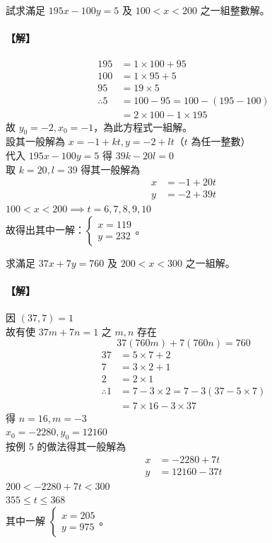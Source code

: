 \begin{example}\label{ex:6-2-10}
試求滿足 $195x - 100y = 5$ 及 $100 < x < 200$ 之一組整數解。

\paragraph{【解】}
\begin{align*}
  195 &= 1 \times 100 + 95 \\
  100 &= 1 \times 95 + 5 \\
  95 &= 19 \times 5 \\
  \therefore 5 &= 100 - 95 = 100 - (195 - 100) \\
  &= 2 \times 100 - 1 \times 195
\end{align*}
故 $y_0 = -2, x_0 = -1$，為此方程式一組解。\\
設其一般解為 $x = -1 + kt, y = -2 + lt$（$t$ 為任一整數）\\
代入 $195x - 100y = 5$ 得 $39k - 20l = 0$\\
取 $k=20, l=39$ 得其一般解為
\begin{align*}
  x &= -1 + 20t \\
  y &= -2 + 39t
\end{align*}
$100 < x < 200 \implies t = 6, 7, 8, 9, 10$\\
故得出其中一解：$\begin{cases} x = 119 \\ y = 232 \end{cases}$。
\end{example}

\begin{example}\label{ex:6-2-11}
求滿足 $37x + 7y = 760$ 及 $200 < x < 300$ 之一組解。

\paragraph{【解】}
因 $(37, 7) = 1$\\
故有使 $37m + 7n = 1$ 之 $m, n$ 存在
\begin{equation*}
  37(760m) + 7(760n) = 760
\end{equation*}
\begin{align*}
  37 &= 5 \times 7 + 2 \\
  7 &= 3 \times 2 + 1 \\
  2 &= 2 \times 1 \\
  \therefore 1 &= 7 - 3 \times 2 = 7 - 3(37 - 5 \times 7) \\
  &= 7 \times 16 - 3 \times 37
\end{align*}
得 $n=16, m=-3$\\
$x_0 = -2280, y_0 = 12160$\\
按例 5 的做法得其一般解為
\begin{align*}
  x &= -2280 + 7t \\
  y &= 12160 - 37t
\end{align*}
$200 < -2280 + 7t < 300$\\
$355 \le t \le 368$\\
其中一解 $\begin{cases} x = 205 \\ y = 975 \end{cases}$。
\end{example}

